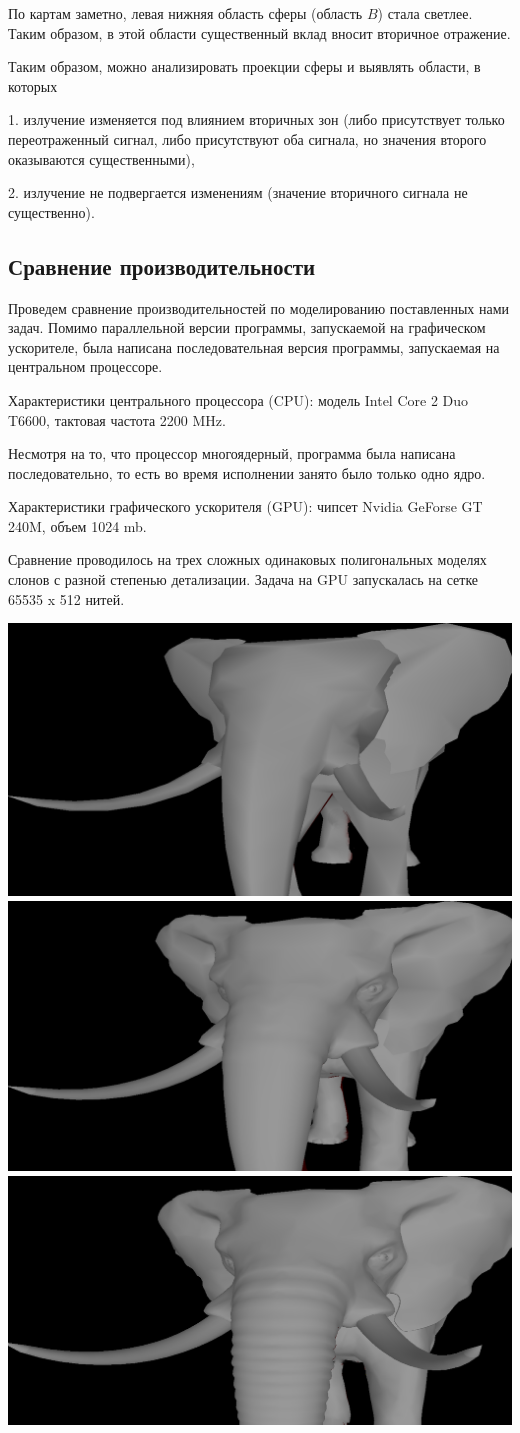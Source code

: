 По картам заметно, левая нижняя область сферы (область $B$) стала светлее. Таким образом, в этой области существенный вклад вносит вторичное отражение. 

Таким образом, можно анализировать проекции сферы и выявлять области, в которых

1. излучение изменяется под влиянием вторичных зон (либо присутствует только переотраженный сигнал, либо присутствуют оба сигнала, но значения второго оказываются существенными),

2. излучение не подвергается изменениям (значение вторичного сигнала не существенно).

\subsection*{Сравнение производительности}

Проведем сравнение производительностей по моделированию поставленных нами задач. Помимо параллельной версии программы, запускаемой на графическом ускорителе, была написана последовательная версия программы, запускаемая на центральном процессоре.  

Характеристики центрального процессора (CPU): модель Intel Core 2 Duo T6600, тактовая частота 2200 MHz. 

Несмотря на то, что процессор многоядерный, программа была написана последовательно, то есть во время исполнении занято было только одно ядро.

Характеристики графического ускорителя (GPU): чипсет Nvidia GeForse GT 240M, объем 1024 mb.

Сравнение проводилось на трех сложных одинаковых полигональных моделях слонов с разной степенью детализации. Задача на GPU запускалась на сетке 65535 x 512 нитей.

\includegraphics[width=0.28\linewidth]{elephav.png}
\includegraphics[width=0.28\linewidth]{elephal.png}
\includegraphics[width=0.305\linewidth]{elepham.png}

